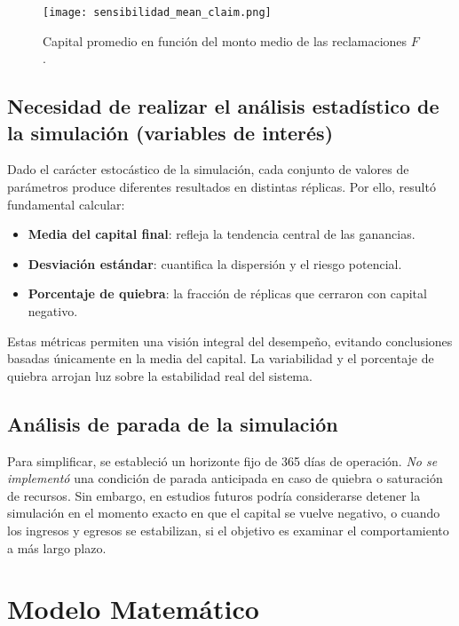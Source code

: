 \documentclass[12pt]{article}
\begin{document}
\begin{figure}[h!]
    \centering
    \texttt{[image: sensibilidad\_mean\_claim.png]}
    \caption{Capital promedio en función del monto medio de las reclamaciones $F$.}
    \label{fig:sensibilidad_mean_claim}
\end{figure}

\subsection{Necesidad de realizar el análisis estadístico de la simulación (variables de interés)}

Dado el carácter estocástico de la simulación, cada conjunto de valores de parámetros produce diferentes resultados en distintas réplicas. Por ello, resultó fundamental calcular:

\begin{itemize}
    \item \textbf{Media del capital final}: refleja la tendencia central de las ganancias.
    \item \textbf{Desviación estándar}: cuantifica la dispersión y el riesgo potencial.
    \item \textbf{Porcentaje de quiebra}: la fracción de réplicas que cerraron con capital negativo.
\end{itemize}

Estas métricas permiten una visión integral del desempeño, evitando conclusiones basadas únicamente en la media del capital. La variabilidad y el porcentaje de quiebra arrojan luz sobre la estabilidad real del sistema.

\subsection{Análisis de parada de la simulación}

Para simplificar, se estableció un horizonte fijo de 365 días de operación. \emph{No se implementó} una condición de parada anticipada en caso de quiebra o saturación de recursos. Sin embargo, en estudios futuros podría considerarse detener la simulación en el momento exacto en que el capital se vuelve negativo, o cuando los ingresos y egresos se estabilizan, si el objetivo es examinar el comportamiento a más largo plazo.



\section{Modelo Matemático}
\end{document}
